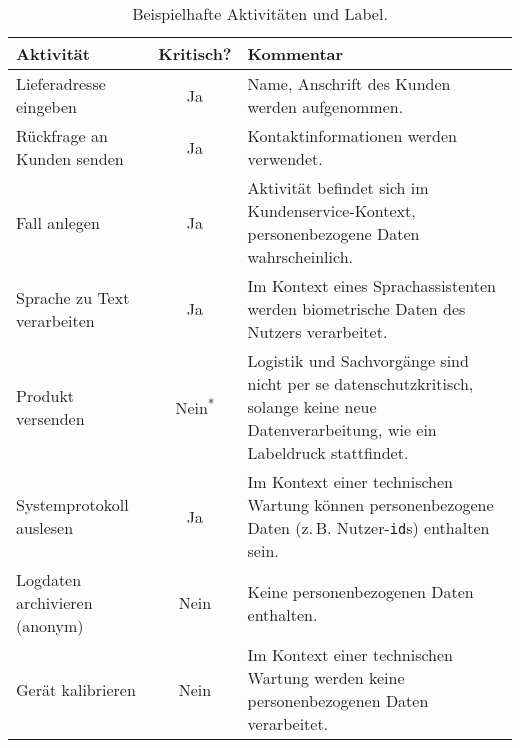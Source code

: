 \begin{table}[htbp]
    \centering
    \caption{Beispielhafte Aktivitäten und Label.}
    \begin{tabularx}{\textwidth}{p{} c p{}}
        \toprule
        Aktivität & Kritisch? & Kommentar \\
        \midrule
        Lieferadresse eingeben & Ja & Name, Anschrift des Kunden werden aufgenommen. \\
        Rückfrage an Kunden senden & Ja & Kontaktinformationen werden verwendet. \\
        Fall anlegen & Ja & Aktivität befindet sich im Kundenservice-Kontext, personenbezogene Daten wahrscheinlich. \\
        Sprache zu Text verarbeiten & Ja & Im Kontext eines Sprachassistenten werden biometrische Daten des Nutzers verarbeitet. \\
        Produkt versenden & Nein\textsuperscript{*} & Logistik und Sachvorgänge sind nicht per se datenschutzkritisch, solange keine neue Datenverarbeitung, wie ein Labeldruck stattfindet. \\
        Systemprotokoll auslesen & Ja & Im Kontext einer technischen Wartung können personenbezogene Daten (z.\,B. Nutzer-\texttt{id}s) enthalten sein. \\
        Logdaten archivieren (anonym) & Nein & Keine personenbezogenen Daten enthalten. \\
        Gerät kalibrieren & Nein & Im Kontext einer technischen Wartung werden keine personenbezogenen Daten verarbeitet. \\
        \bottomrule
    \end{tabularx}
    \label{tab:labeling-examples}
\end{table}